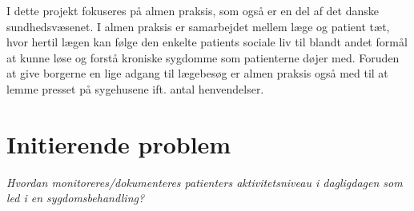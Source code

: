 I dette projekt fokuseres på almen praksis, som også er en del af det danske sundhedsvæsenet. I almen praksis er samarbejdet mellem læge og patient tæt, hvor hertil lægen kan følge den enkelte patients sociale liv til blandt andet formål at kunne løse og forstå kroniske sygdomme som patienterne døjer med. 
Foruden at give borgerne en lige adgang til lægebesøg er almen praksis også med til at lemme presset på sygehusene ift. antal henvendelser. \citep{vedsted2014}





\section{Initierende problem}
\textit{Hvordan monitoreres/dokumenteres patienters aktivitetsniveau i dagligdagen som led i en sygdomsbehandling?}  
